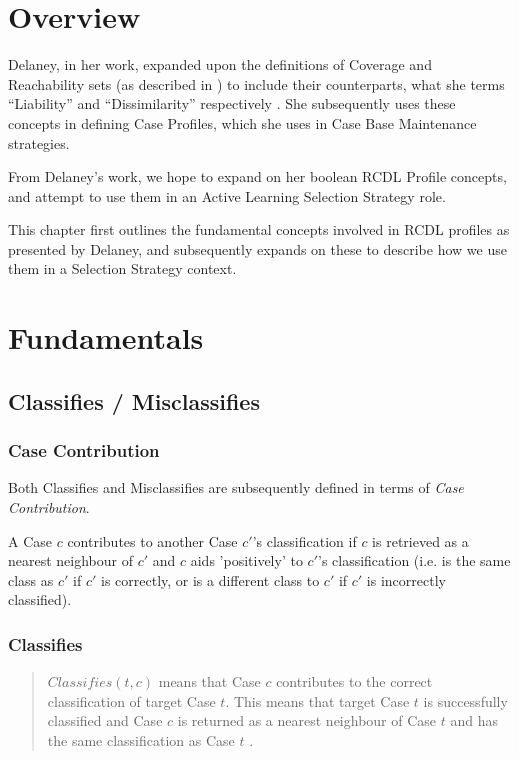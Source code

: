 \documentclass[a4paper,11pt]{report}
\begin{document}
\section{Overview}

Delaney, in her work, expanded upon the definitions of Coverage and Reachability sets (as described in \citet{Smyth1995}) to include their counterparts, what she terms ``Liability'' and ``Dissimilarity'' respectively \citep{Delany2009}. She subsequently uses these concepts in defining Case Profiles, which she uses in Case Base Maintenance strategies.

From Delaney's work, we hope to expand on her boolean RCDL Profile concepts, and attempt to use them in an Active Learning Selection Strategy role.

This chapter first outlines the fundamental concepts involved in RCDL profiles as presented by Delaney, and subsequently expands on these to describe how we use them in a Selection Strategy context.

\section{Fundamentals}
\subsection{Classifies / Misclassifies}
\subsubsection{Case Contribution\label{sec:contributes}}
Both Classifies and Misclassifies are subsequently defined in terms of \emph{Case Contribution}.

A Case $c$ contributes to another Case $c'$'s classification if $c$ is retrieved as a nearest neighbour of $c'$ and $c$ aids 'positively' to $c'$'s classification (i.e. is the same class as $c'$ if $c'$ is correctly, or is a different class to  $c'$ if  $c'$ is incorrectly classified).
\subsubsection{Classifies}
\begin{quote}
$ Classifies(t, c) $ means that Case $c$ contributes to the correct classification of target Case $t$. This means that target Case $t$ is successfully classified and Case $c$ is returned as a nearest neighbour of Case $t$ and has the same classification as Case $t$ \citep{Delany2009}.
\end{quote}
\end{document}
